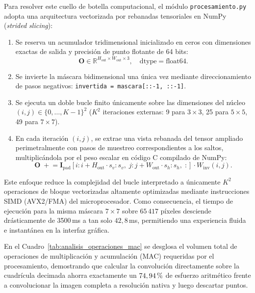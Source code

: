 \documentclass[11pt]{article}
\newcommand{\pct}{\ensuremath{\mathrm{\char37}}}
\begin{document}
Para resolver este cuello de botella computacional, el módulo \texttt{procesamiento.py} adopta una arquitectura vectorizada por rebanadas tensoriales en NumPy (\textit{strided slicing}):
\begin{enumerate}[itemsep=0.2em]
\item Se reserva un acumulador tridimensional inicializado en ceros con dimensiones exactas de salida y precisión de punto flotante de 64 bits:
\begin{equation}
\mathbf{O} \in \mathbb{R}^{H_{\text{out}} \times W_{\text{out}} \times 3}, \quad \text{dtype} = \text{float64}.
\end{equation}
\item Se invierte la máscara bidimensional una única vez mediante direccionamiento de pasos negativos: \texttt{invertida = mascara[::-1, ::-1]}.
\item Se ejecuta un doble bucle finito únicamente sobre las dimensiones del núcleo $(i, j) \in \{0, \ldots, K-1\}^2$ ($K^2$ iteraciones externas: 9 para $3\times3$, 25 para $5\times5$, 49 para $7\times7$).
\item En cada iteración $(i, j)$, se extrae una vista rebanada del tensor ampliado perimetralmente con pasos de muestreo correspondientes a los saltos, multiplicándola por el peso escalar en código C compilado de NumPy:
\begin{equation}
\mathbf{O} \;\mathrel{+}= \mathbf{I}_{\text{pad}}[i : i + H_{\text{out}} \cdot s_v : s_v, \; j : j + W_{\text{out}} \cdot s_h : s_h, \; :] \cdot W_{\text{inv}}(i, j).
\end{equation}
\end{enumerate}
Este enfoque reduce la complejidad del bucle interpretado a únicamente $K^2$ operaciones de bloque vectorizadas altamente optimizadas mediante instrucciones SIMD (AVX2/FMA) del microprocesador. Como consecuencia, el tiempo de ejecución para la misma máscara $7\times7$ sobre $65\,417$ píxeles desciende drásticamente de 3500\,ms a tan solo $42,8$\,ms, permitiendo una experiencia fluida e instantánea en la interfaz gráfica.

En el Cuadro~\ref{tab:analisis_operaciones_mac} se desglosa el volumen total de operaciones de multiplicación y acumulación (MAC) requeridas por el procesamiento, demostrando que calcular la convolución directamente sobre la cuadrícula decimada ahorra exactamente un $74,94\,\pct$ de esfuerzo aritmético frente a convolucionar la imagen completa a resolución nativa y luego descartar puntos.
\end{document}

